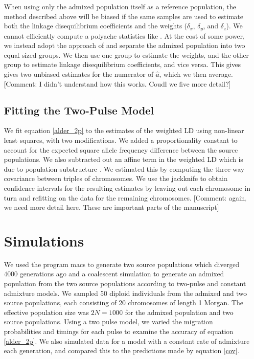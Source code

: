 When using only the admixed population itself as a reference population, the method described above will be biased if the same samples are used to estimate both the linkage disequilibrium coefficients and the weights ($\delta_x$, $\delta_y$, and $\delta_z$). We cannot efficiently compute a polyache statistics like \cite{loh2013inferring}. At the cost of some power, we instead adopt the approach of \cite{pickrell2012inference} and separate the admixed population into two equal-sized groups. We then use one group to estimate the weights, and the other group to estimate linkage disequilibrium coefficients, and vice versa. This gives gives two unbiased estimates for the numerator of $\hat{a}$, which we then average. [Comment: I didn't understand how this works.  Coudl we five more detail?]
\subsection{Fitting the Two-Pulse Model}
We fit equation \ref{alder_2p} to the estimates of the weighted LD using non-linear least squares, with two modifications. We added a proportionality constant to account for the expected square allele frequency difference between the source populations. We also subtracted out an affine term in the weighted LD which is due to population substructure \cite{loh2013inferring}. We estimated this by computing the three-way covariance between triples of chromosomes. We use the jackknife to obtain confidence intervals for the resulting estimates by leaving out each chromosome in turn and refitting on the data for the remaining chromosomes.  [Comment: again, we need more detail here. These are important parts of the manuscript]
\section{Simulations}
We used the program macs \cite{chen2009fast} to generate two source populations which diverged 4000 generations ago and a coalescent simulation to generate an admixed population from the two source populations according to two-pulse and constant admixture models. We sampled 50 diploid individuals from the admixed and two source populations, each consisting of 20 chromosomes of length 1 Morgan. The effective population size was $2N=1000$ for the admixed population and two source populations. Using a two pulse model, we varied the migration probabilities and timings for each pulse to examine the accuracy of equation \ref{alder_2p}. We also simulated data for a model with a constant rate of admixture each generation, and compared this to the predictions made by equation \ref{cov}.
